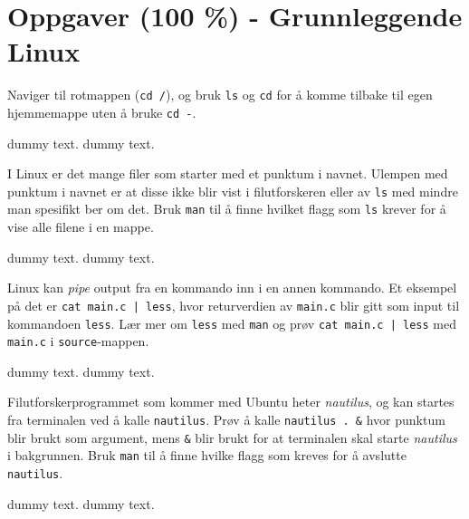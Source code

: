 \section{Oppgaver (100 \%) - Grunnleggende Linux}\label{sec:3-oppgave}


\begin{subprob}
    Naviger til rotmappen (\verb|cd /|), og bruk \verb|ls| og \verb|cd| for å komme tilbake til egen hjemmemappe uten å bruke \verb|cd -|.
	\begin{solution}
	    dummy text. dummy text. 
	\end{solution}
\end{subprob}

\begin{subprob}
    I Linux er det mange filer som starter med et punktum i navnet. Ulempen med punktum i navnet er at disse ikke blir vist i filutforskeren eller av \verb|ls| med mindre man spesifikt ber om det. Bruk \verb|man| til å finne hvilket flagg som \verb|ls| krever for å vise alle filene i en mappe. 
	\begin{solution}
	    dummy text. dummy text. 
	\end{solution}
\end{subprob}

\begin{subprob}
    Linux kan \textit{pipe} output fra en kommando inn i en annen kommando. Et eksempel på det er \texttt{cat main.c | less}, hvor returverdien av \verb|main.c| blir gitt som input til kommandoen \verb|less|. Lær mer om \verb|less| med \verb|man| og prøv \texttt{cat main.c | less} med \verb|main.c| i \verb|source|-mappen.
    
	\begin{solution}
	    dummy text. dummy text. 
	\end{solution}
\end{subprob}

\begin{subprob}
    Filutforskerprogrammet som kommer med Ubuntu heter \textit{nautilus}, og kan startes fra terminalen ved å kalle \verb|nautilus|. Prøv å kalle \verb|nautilus . &| hvor punktum blir brukt som argument, mens \verb|&| blir brukt for at terminalen skal starte \textit{nautilus} i bakgrunnen. Bruk \verb|man| til å finne hvilke flagg som kreves for å avslutte \verb|nautilus|.
    \begin{solution}
        dummy text. dummy text. 
	\end{solution}
\end{subprob}

